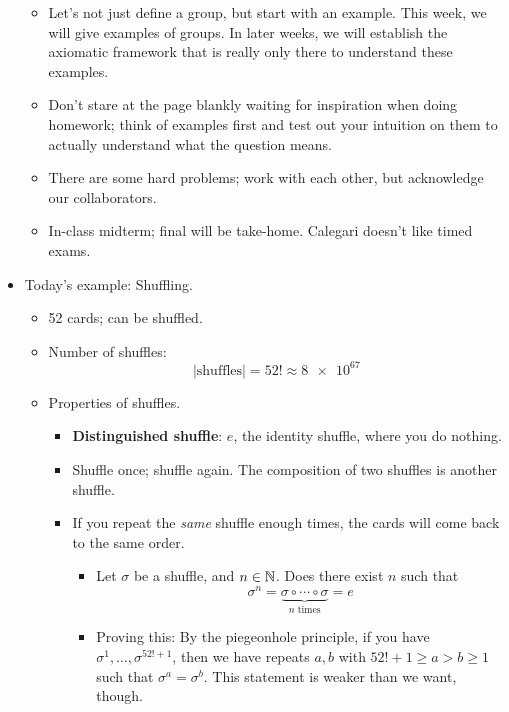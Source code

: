 \documentclass[../notes.tex]{subfiles}
\begin{document}
\begin{itemize}
\begin{itemize}
        \item Let's not just define a group, but start with an example. This week, we will give examples of groups. In later weeks, we will establish the axiomatic framework that is really only there to understand these examples.
        \item Don't stare at the page blankly waiting for inspiration when doing homework; think of examples first and test out your intuition on them to actually understand what the question means.
        \item There are some hard problems; work with each other, but acknowledge our collaborators.
        \item In-class midterm; final will be take-home. Calegari doesn't like timed exams.
    \end{itemize}
    \item Today's example: Shuffling.
    \begin{itemize}
        \item 52 cards; can be shuffled.
        \item Number of shuffles:
        \begin{equation*}
            |\text{shuffles}| = 52! \approx \num{8e67}
        \end{equation*}
        \item Properties of shuffles.
        \begin{itemize}
            \item \textbf{Distinguished shuffle}: $e$, the identity shuffle, where you do nothing.
            \item Shuffle once; shuffle again. The composition of two shuffles is another shuffle.
            \item If you repeat the \emph{same} shuffle enough times, the cards will come back to the same order.
            \begin{itemize}
                \item Let $\sigma$ be a shuffle, and $n\in\mathbb{N}$. Does there exist $n$ such that
                \begin{equation*}
                    \sigma^n = \underbrace{\sigma\circ\cdots\circ\sigma}_{n\text{ times}} = e
                \end{equation*}
                \item Proving this: By the piegeonhole principle, if you have $\sigma^1,\dots,\sigma^{52!+1}$, then we have repeats $a,b$ with $52!+1\geq a>b\geq 1$ such that $\sigma^a=\sigma^b$. This statement is weaker than we want, though.

\end{itemize}
\end{itemize}
\end{itemize}
\end{itemize}
\end{document}
